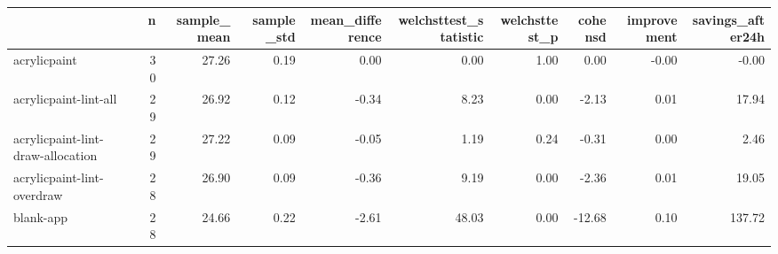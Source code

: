\begin{tabular}{lrrrrrrrrr}
\toprule
{} &   n &  sample\_mean &  sample\_std &  mean\_difference &  welchsttest\_statistic &  welchsttest\_p &  cohensd &  improvement &  savings\_after24h \\
\midrule
acrylicpaint                      &  30 &        27.26 &        0.19 &             0.00 &                   0.00 &           1.00 &     0.00 &        -0.00 &             -0.00 \\
acrylicpaint-lint-all             &  29 &        26.92 &        0.12 &            -0.34 &                   8.23 &           0.00 &    -2.13 &         0.01 &             17.94 \\
acrylicpaint-lint-draw-allocation &  29 &        27.22 &        0.09 &            -0.05 &                   1.19 &           0.24 &    -0.31 &         0.00 &              2.46 \\
acrylicpaint-lint-overdraw        &  28 &        26.90 &        0.09 &            -0.36 &                   9.19 &           0.00 &    -2.36 &         0.01 &             19.05 \\
blank-app                         &  28 &        24.66 &        0.22 &            -2.61 &                  48.03 &           0.00 &   -12.68 &         0.10 &            137.72 \\
\bottomrule
\end{tabular}
